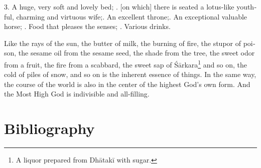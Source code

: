 \begin{otherlanguage}{english}
\begin{tlate}
  3. A huge, very soft and lovely bed; \hfill {}. [on which] there is seated a lotus-like youthful, charming and virtuous wife;\hfill {}. An excellent throne;\hfill {}. An exceptional valuable horse; \hfill {}. Food that pleases the senses; \hfill {}. Various drinks. \hfill \break 
\end{tlate}
\begin{tlate}
Like the rays of the sun, the butter of milk, the burning of fire, the stupor of poison, the sesame oil from the sesame seed, the shade from the tree, the sweet odor from a fruit, the fire from a scabbard, the sweet sap of Śārkara\footnote{A liquor prepared from Dhātakī with sugar.} and so on, the cold of piles of snow, and so on is the inherent essence of things. In the same way, the course of the world is also in the center of the highest God's own form. And the Most High God is indivisible and all-filling.
\end{tlate}


\end{otherlanguage}
  
 \section{Bibliography}
 \label{sec:bibli}
 

\printshorthands[keyword=critEd]

\printbibliography[title=Consulted Manuskcipts, keyword=codex]

\printbibliography[title=Printed Editions and e-Texts, keyword=printsource]

\printbibliography[title=Secondary Literature, keyword=seclit]
